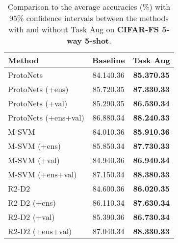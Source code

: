 \documentclass[10pt,twocolumn,letterpaper]{article}
\begin{document}
\begin{table}[t]
\caption{Comparison to the average accuracies (\%) with 95\% confidence intervals between the methods with and without Task Aug on \textbf{CIFAR-FS 5-way 5-shot}.}
\label{CIFAR-FS_5shot}
\begin{center}
\begin{tabular}{lcc}
\toprule[1pt]
\textbf{Method} & Baseline & Task Aug \\
\hline
ProtoNets~\cite{snell2017prototypical} & 84.140.36 & \textbf{85.370.35}\\
ProtoNets (+ens) & 85.720.35 & \textbf{87.330.33}\\
ProtoNets (+val) & 85.290.35 & \textbf{86.530.34}\\
ProtoNets (+ens+val) & 86.880.34 & \textbf{88.240.33}\\
\hline
M-SVM~\cite{lee2019meta} & 84.010.36 & \textbf{85.910.36}\\
M-SVM (+ens) & 85.850.34 & \textbf{87.730.33}\\
M-SVM (+val) & 84.940.36 & \textbf{86.940.34}\\
M-SVM (+ens+val) & 87.150.34 & \textbf{88.380.33}\\
\hline
R2-D2~\cite{bertinetto2018meta} & 84.600.36 & \textbf{86.020.35}\\
R2-D2 (+ens) & 86.110.34 & \textbf{87.630.34}\\
R2-D2 (+val) & 85.390.36 & \textbf{86.730.34}\\
R2-D2 (+ens+val) & 87.040.34 & \textbf{88.330.33}\\
\bottomrule[1pt]
\end{tabular}
\end{center}
\end{table}
\end{document}
